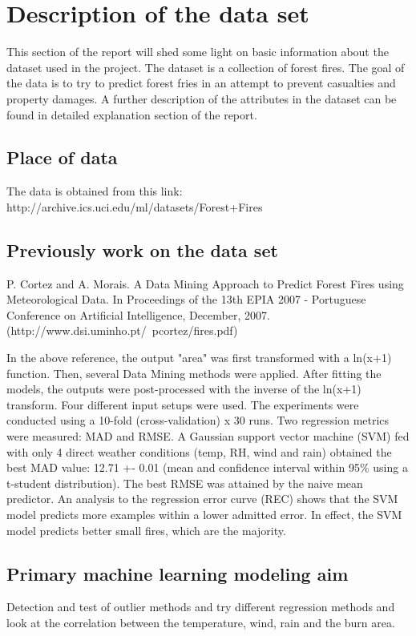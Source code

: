 \section{Description of the data set}
This section of the report will shed some light on basic information about the dataset used in the project. The dataset is a collection of forest fires. The goal of the data is to try to predict forest fries in an attempt to prevent casualties and property damages. A further description of the attributes in the dataset can be found in detailed explanation section of the report.

\subsection{Place of data}
The data is obtained from this link: http://archive.ics.uci.edu/ml/datasets/Forest+Fires

\subsection{Previously work on the data set}
P. Cortez and A. Morais. A Data Mining Approach to Predict Forest Fires using Meteorological Data.
In Proceedings of the 13th EPIA 2007 - Portuguese Conference on Artificial Intelligence, 
December, 2007. (http://www.dsi.uminho.pt/~pcortez/fires.pdf) \newline

In the above reference, the output "area" was first transformed with a ln(x+1) function.
Then, several Data Mining methods were applied. After fitting the models, the outputs were
post-processed with the inverse of the ln(x+1) transform. Four different input setups were
used. The experiments were conducted using a 10-fold (cross-validation) x 30 runs. Two
regression metrics were measured: MAD and RMSE. A Gaussian support vector machine (SVM) fed
with only 4 direct weather conditions (temp, RH, wind and rain) obtained the best MAD value:
12.71 +- 0.01 (mean and confidence interval within 95\% using a t-student distribution). The
best RMSE was attained by the naive mean predictor. An analysis to the regression error curve
(REC) shows that the SVM model predicts more examples within a lower admitted error. In effect,
the SVM model predicts better small fires, which are the majority.

\subsection{Primary machine learning modeling aim}
Detection and test of outlier methods and try different regression methods and look at the correlation between the temperature, wind, rain and the burn area. 
